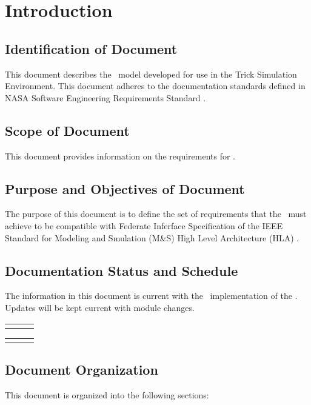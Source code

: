 \chapter{Introduction}\label{sec:intro}



\section{Identification of Document}
This document describes the \TrickHLA\
model developed for use in the Trick Simulation Environment.
This document adheres to the documentation standards defined in
NASA Software Engineering Requirements Standard \cite{NASA:SWE}.

\section{Scope of Document}
This document provides information on the requirements for \TrickHLA.

\section{Purpose and Objectives of Document}
The purpose of this document is to define the set of requirements that
the \TrickHLA\ must achieve to be compatible with Federate Inferface
Specification of the IEEE Standard for Modeling and Smulation (M\&S)
High Level Architecture (HLA) \cite{IEEE1516:API}.

\section{Documentation Status and Schedule}
The information in this document is current with the \TrickHLAid\
implementation of the \TrickHLA. Updates will be kept current with
module changes.

\begin{tabular}{||l|l|l|} \hline
\documentHistory
\end{tabular}

\begin{tabular}{||l|l|l|} \hline
\DocumentChangeHistory
\end{tabular}

\section{Document Organization}
This document is organized into the following sections:

